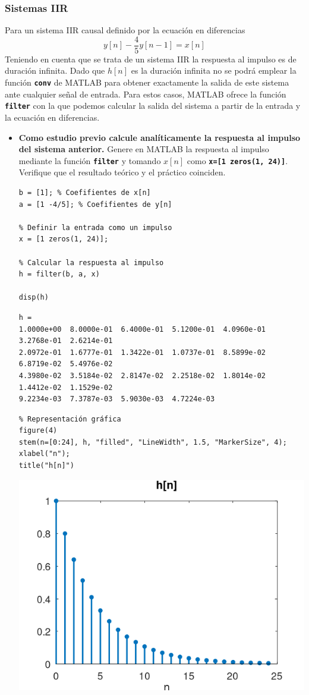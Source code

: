 \documentclass[12pt]{article}
\newcommand{\code}[1]{\texttt{\textbf{#1}}}
\begin{document}
\subsubsection*{Sistemas IIR}
Para un sistema IIR causal definido por la ecuación en diferencias \[ y[n]-\dfrac{4}{5}y[n-1]=x[n] \]
Teniendo en cuenta que se trata de un sistema IIR la respuesta al impulso es de duración infinita. Dado que $h[n]$ es la duración infinita no se podrá emplear la función \code{conv} de MATLAB para obtener exactamente la salida de este sistema ante cualquier señal de entrada. Para estos casos, MATLAB ofrece la función \code{filter} con la que podemos calcular la salida del sistema a partir de la entrada y la ecuación en diferencias.
\begin{itemize}
	\item \textbf{Como estudio previo calcule analíticamente la respuesta al impulso del sistema anterior.} Genere en MATLAB la respuesta al impulso mediante la función \code{filter} y tomando $x[n]$ como \linebreak \code{x=[1 zeros(1, 24)]}. Verifique que el resultado teórico y el práctico coinciden.
	
	\begin{lstlisting}
b = [1]; % Coefifientes de x[n]
a = [1 -4/5]; % Coefifientes de y[n]

% Definir la entrada como un impulso
x = [1 zeros(1, 24)];

% Calcular la respuesta al impulso
h = filter(b, a, x)

disp(h)
	\end{lstlisting}
	
\begin{verbatim}
h =
1.0000e+00  8.0000e-01  6.4000e-01  5.1200e-01  4.0960e-01  3.2768e-01  2.6214e-01
2.0972e-01  1.6777e-01  1.3422e-01  1.0737e-01  8.5899e-02  6.8719e-02  5.4976e-02
4.3980e-02  3.5184e-02  2.8147e-02  2.2518e-02  1.8014e-02  1.4412e-02  1.1529e-02
9.2234e-03  7.3787e-03  5.9030e-03  4.7224e-03
\end{verbatim}

\begin{lstlisting}
% Representación gráfica
figure(4)
stem(n=[0:24], h, "filled", "LineWidth", 1.5, "MarkerSize", 4);
xlabel("n");
title("h[n]")
\end{lstlisting}

\begin{center}
	\includegraphics[width=0.7\linewidth]{Imágenes/Figura4}
\end{center}
	

\end{itemize}
\end{document}
